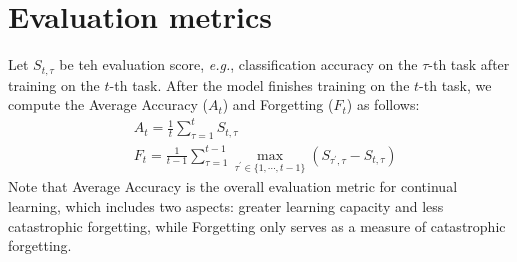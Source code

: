 \documentclass[runningheads]{llncs}
\newcommand{\eg}{\emph{e.g.}\xspace}
\begin{document}
\section{Evaluation metrics} \label{app:eval_metrics}
Let $S_{t, \tau}$ be teh evaluation score, \eg, classification accuracy on the $\tau$-th task  after training on the $t$-th task. After the model finishes training on the $t$-th task, we compute the Average Accuracy ($A_t$) and Forgetting ($F_t$) as follows:
\begin{equation*}
\begin{aligned}
&A_{t}=\frac{1}{t} \sum_{\tau=1}^{t} S_{t, \tau}\\
&F_{t}=\frac{1}{t-1} \sum_{\tau=1}^{t-1} \max _{\tau^{\prime} \in\{1, \cdots, t-1\}}\left(S_{\tau^{\prime}, \tau}-S_{t, \tau}\right)
\end{aligned}
\end{equation*}
Note that Average Accuracy is the overall evaluation metric for continual learning, which includes two aspects: greater learning capacity and less catastrophic forgetting, while Forgetting only serves as a measure of catastrophic forgetting.
\end{document}
